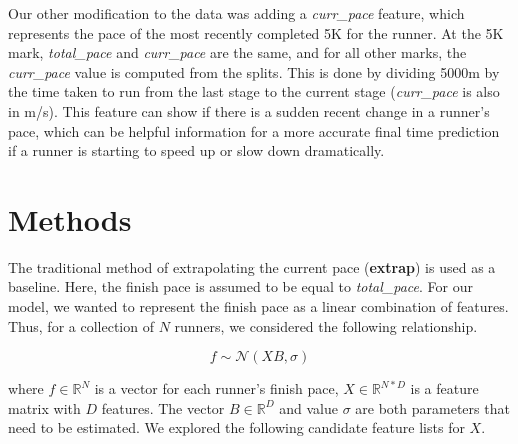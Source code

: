\documentclass[USenglish,twocolumn]{article}
\theoremstyle{dgthm}
\theoremstyle{dgdef}
\begin{document}

Our other modification to the data was adding a \emph{curr\_pace} feature, which represents the pace of the most recently completed 5K for the runner. At the 5K mark, \emph{total\_pace} and \emph{curr\_pace} are the same, and for all other marks, the \emph{curr\_pace} value is computed from the splits. This is done by dividing 5000m by the time taken to run from the last stage to the current stage (\emph{curr\_pace} is also in m/s). This feature can show if there is a sudden recent change in a runner's pace, which can be helpful information for a more accurate final time prediction if a runner is starting to speed up or slow down dramatically.

\section{Methods}
\label{methods}

The traditional method of extrapolating the current pace (\textbf{extrap}) is used as a baseline. Here, the finish pace is assumed to be equal to \emph{total\_pace}. For our model, we wanted to represent the finish pace as a linear combination of features. Thus, for a collection of $N$ runners, we considered the following relationship.

\begin{equation}
f \sim  \mathcal{N}(XB, \sigma) %
\label{eq:1}
\end{equation} %

where $f \in \mathbb{R}^{N}$ is a vector for each runner's finish pace, $X \in \mathbb{R}^{N * D}$ is a feature matrix with $D$ features. The vector $B \in \mathbb{R}^{D}$ and value $\sigma$ are both parameters that need to be estimated. We explored the following candidate feature lists for $X$. \\

\end{document}

